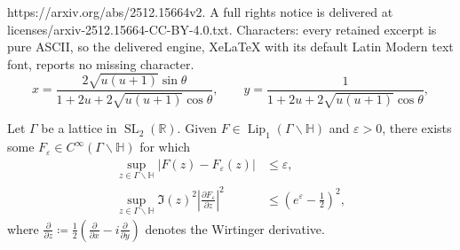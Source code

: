 \documentclass[10pt,a4paper]{amsart}
\DeclareMathOperator{\Lip}{Lip}
\DeclareMathOperator{\SL}{SL}
\newcommand{\Hb}{\mathbb{H}}
\newcommand{\R}{\mathbb{R}}
\newcommand{\dee}{\partial}
\newcommand{\e}{\varepsilon}
\begin{document}
https://arxiv.org/abs/2512.15664v2. A full rights notice is delivered at licenses/arxiv-2512.15664-CC-BY-4.0.txt. Characters: every retained excerpt is pure ASCII, so the delivered engine, XeLaTeX with its default Latin Modern text font, reports no missing character.
\begin{equation}
\label{eqn:geodesicpolar}
x = \frac{2 \sqrt{u(u + 1)} \sin \theta}{1 + 2u + 2 \sqrt{u(u + 1)} \cos \theta}, \qquad y = \frac{1}{1 + 2u + 2 \sqrt{u(u + 1)} \cos \theta},
\end{equation}

\begin{lemma}
\label{lem:smoothing}
Let $\Gamma$ be a lattice in $\SL_2(\R)$. Given $F \in \Lip_1(\Gamma \backslash \Hb)$ and $\e > 0$, there exists some $F_{\e} \in C^{\infty}(\Gamma \backslash \Hb)$ for which
\begin{align}
\label{eqn:Fesup}
\sup_{z \in \Gamma \backslash \Hb} |F(z) - F_{\e}(z)| & \leq \e,	\\
\label{eqn:nablaFesup}
\sup_{z \in \Gamma \backslash \Hb} \Im(z)^2 \left|\frac{\dee F_{\e}}{\dee z}\right|^2 & \leq \left(e^{\e} - \frac{1}{2}\right)^2,
\end{align}
where $\frac{\dee}{\dee z} \coloneqq \frac{1}{2} (\frac{\dee}{\dee x} - i \frac{\dee}{\dee y})$ denotes the Wirtinger derivative.
\end{lemma}
\end{document}
